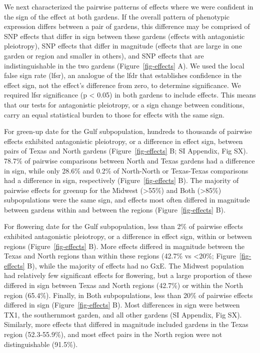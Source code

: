 \documentclass[
  9pt,
  twocolumn,
  twoside]{pnas-new}
\begin{document}
We next characterized the pairwise patterns of effects where we were
confident in the sign of the effect at both gardens. If the overall
pattern of phenotypic expression differs between a pair of gardens, this
difference may be comprised of SNP effects that differ in sign between
these gardens (effects with antagonistic pleiotropy), SNP effects that
differ in magnitude (effects that are large in one garden or region and
smaller in others), and SNP effects that are indistinguishable in the
two gardens (Figure~\ref{fig-effects} A). We used the local false sign
rate (lfsr), an analogue of the lfdr that establishes confidence in the
effect sign, not the effect's difference from zero, to determine
significance. We required lfsr significance (p \textless{} 0.05) in both
gardens to include effects. This means that our tests for antagonistic
pleiotropy, or a sign change between conditions, carry an equal
statistical burden to those for effects with the same sign.

For green-up date for the Gulf subpopulation, hundreds to thousands of
pairwise effects exhibited antagonistic pleiotropy, or a difference in
effect sign, between pairs of Texas and North gardens
(Figure~\ref{fig-effects} B; SI Appendix, Fig SX). 78.7\% of pairwise
comparisons between North and Texas gardens had a difference in sign,
while only 28.6\% and 0.2\% of North-North or Texas-Texas comparisons
had a difference in sign, respectively (Figure~\ref{fig-effects} B). The
majority of pairwise effects for greenup for the Midwest
(\textgreater55\%) and Both (\textgreater85\%) subpopulations were the
same sign, and effects most often differed in magnitude between gardens
within and between the regions (Figure~\ref{fig-effects} B).

For flowering date for the Gulf subpopulation, less than 2\% of pairwise
effects exhibited antagonistic pleiotropy, or a difference in effect
sign, within or between regions (Figure~\ref{fig-effects} B). More
effects differed in magnitude between the Texas and North regions than
within these regions (42.7\% vs \textless20\%; Figure~\ref{fig-effects}
B), while the majority of effects had no GxE. The Midwest population had
relatively few significant effects for flowering, but a large proportion
of these differed in sign between Texas and North regions (42.7\%) or
within the North region (65.4\%). Finally, in Both subpopulations, less
than 20\% of pairwise effects differed in sign (Figure~\ref{fig-effects}
B). Most differences in sign were between TX1, the southernmost garden,
and all other gardens (SI Appendix, Fig SX). Similarly, more effects
that differed in magnitude included gardens in the Texas region
(52.3-55.9\%), and most effect pairs in the North region were not
distinguishable (91.5\%).
\end{document}
